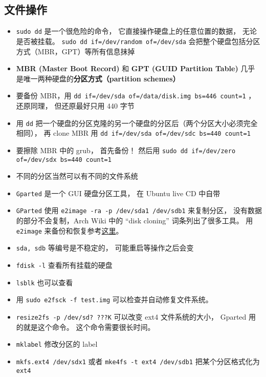 
\begin{issues}
\issueDraft
\end{issues}

\subsection{文件操作}
\begin{itemize}
\item \verb|sudo dd| 是一个很危险的命令， 它直接操作硬盘上的任意位置的数据， 无论是否被挂载。 \verb|sudo dd if=/dev/random of=/dev/sda| 会把整个硬盘包括分区方式（MBR，GPT）等所有信息抹掉
\item \textbf{MBR (Master Boot Record)} 和 \textbf{GPT (GUID Partition Table)} 几乎是唯一两种硬盘的\textbf{分区方式（partition schemes）}
\item 要备份 MBR，用 \verb|dd if=/dev/sda of=/data/disk.img bs=446 count=1| ， 还原同理， 但还原最好只用 440 字节
\item 用 \verb|dd| 把一个硬盘的分区克隆的另一个硬盘的分区后（两个分区大小必须完全相同）， 再 clone MBR 用 \verb|dd if=/dev/sda of=/dev/sdc bs=440 count=1|
\item 要擦除 MBR 中的 grub， 首先备份！ 然后用 \verb|sudo dd if=/dev/zero of=/dev/sdx bs=440 count=1|
\item 不同的分区当然可以有不同的文件系统
\item \verb|Gparted| 是一个 GUI 硬盘分区工具， 在 Ubuntu live CD 中自带
\item \verb|GParted| 使用 \verb|e2image -ra -p /dev/sda1 /dev/sdb1| 来复制分区， 没有数据的部分不会复制，Arch Wiki 中的 “disk cloning” 词条列出了很多工具。 用 \verb|e2image| 来备份和恢复参考\href{https://stackoverflow.com/questions/51755887/backup-and-restore-e2image-how-do-i-properly-pipe-the-output-from-lzop}{这里}。
\item \verb|sda, sdb| 等编号是不稳定的， 可能重启等操作之后会变
\item \verb|fdisk -l| 查看所有挂载的硬盘
\item \verb|lsblk| 也可以查看
\item 用 \verb|sudo e2fsck -f test.img| 可以检查并自动修复文件系统。
\item \verb|resize2fs -p /dev/sd? ???K| 可以改变 ext4 文件系统的大小， Gparted 用的就是这个命令。 这个命令需要很长时间。
\item \verb|mklabel| 修改分区的 label
\item \verb|mkfs.ext4 /dev/sdx1| 或者 \verb|mke4fs -t ext4 /dev/sdb1| 把某个分区格式化为 \verb|ext4|

\end{itemize}
